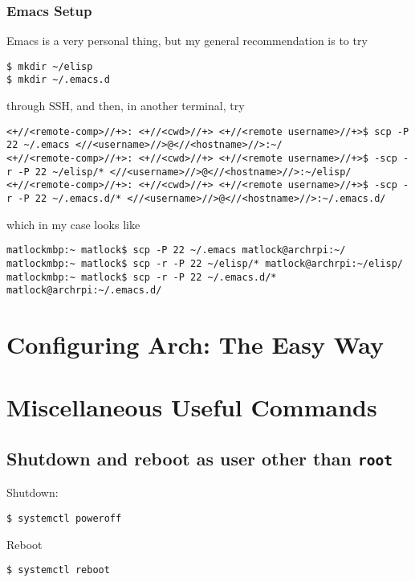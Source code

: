 \documentclass[12pt,letterpaper]{article}
\begin{document}
\subsubsection{Emacs Setup}
Emacs is a very personal thing, but my general recommendation is to try
\begin{lstlisting}
$ mkdir ~/elisp
$ mkdir ~/.emacs.d
\end{lstlisting}
through SSH, and then, in another terminal, try
\begin{lstlisting}[basicstyle=\ttfamily\footnotesize]
<+//<remote-comp>//+>: <+//<cwd>//+> <+//<remote username>//+>$ scp -P 22 ~/.emacs <//<username>//>@<//<hostname>//>:~/
<+//<remote-comp>//+>: <+//<cwd>//+> <+//<remote username>//+>$ -scp -r -P 22 ~/elisp/* <//<username>//>@<//<hostname>//>:~/elisp/
<+//<remote-comp>//+>: <+//<cwd>//+> <+//<remote username>//+>$ -scp -r -P 22 ~/.emacs.d/* <//<username>//>@<//<hostname>//>:~/.emacs.d/
\end{lstlisting}
which in my case looks like
\begin{lstlisting}[basicstyle=\ttfamily\footnotesize]
matlockmbp:~ matlock$ scp -P 22 ~/.emacs matlock@archrpi:~/
matlockmbp:~ matlock$ scp -r -P 22 ~/elisp/* matlock@archrpi:~/elisp/
matlockmbp:~ matlock$ scp -r -P 22 ~/.emacs.d/* matlock@archrpi:~/.emacs.d/
\end{lstlisting}

\section{Configuring Arch: The Easy Way}

\section{Miscellaneous Useful Commands}

\subsection{Shutdown and reboot as user other than \lstinline{root}}
Shutdown:
\begin{lstlisting}
$ systemctl poweroff
\end{lstlisting}

Reboot
\begin{lstlisting}
$ systemctl reboot
\end{lstlisting}
\end{document}
